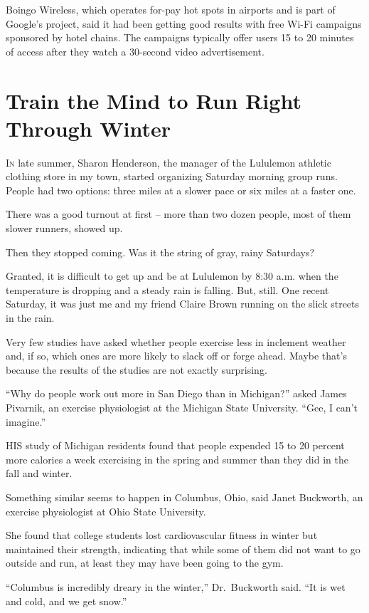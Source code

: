 ﻿\documentclass[12pt]{article}
\begin{document}
Boingo Wireless, which operates for-pay hot spots in airports and is part of Google's project, said
it had been getting good results with free Wi-Fi campaigns sponsored by hotel chains. The campaigns
typically offer users 15 to 20 minutes of access after they watch a 30-second video advertisement.

\section{Train the Mind to Run Right Through Winter}

\lettrine{I}{n} late summer, Sharon Henderson, the manager of the Lululemon
athletic clothing store in my town, started organizing Saturday morning group runs. People had two
options: three miles at a slower pace or six miles at a faster one.

There was a good turnout at first -- more than two dozen people, most of them slower runners, showed
up.

Then they stopped coming. Was it the string of gray, rainy Saturdays?

Granted, it is difficult to get up and be at Lululemon by 8:30 a.m. when the temperature is dropping
and a steady rain is falling. But, still. One recent Saturday, it was just me and my friend Claire
Brown running on the slick streets in the rain.

Very few studies have asked whether people exercise less in inclement weather and, if so, which ones
are more likely to slack off or forge ahead. Maybe that's because the results of the studies are not
exactly surprising.

``Why do people work out more in San Diego than in Michigan?'' asked James Pivarnik, an exercise
physiologist at the Michigan State University. ``Gee, I can't imagine.''

HIS study of Michigan residents found that people expended 15 to 20 percent more calories a week
exercising in the spring and summer than they did in the fall and winter.

Something similar seems to happen in Columbus, Ohio, said Janet Buckworth, an exercise physiologist
at Ohio State University.

She found that college students lost cardiovascular fitness in winter but maintained their strength,
indicating that while some of them did not want to go outside and run, at least they may have been
going to the gym.

``Columbus is incredibly dreary in the winter,'' Dr.~Buckworth said. ``It is wet and cold, and we
get snow.''
\end{document}
